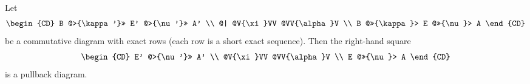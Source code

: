 Let
$$
\begin{CD}
B @>{\kappa'}>> E' @>{\nu'}>> A' \\
@| @V{\xi}VV @VV{\alpha}V \\
B @>>{\kappa}> E @>>{\nu}> A
\end{CD}
$$
be a commutative diagram with exact rows (each row is a short exact sequence). Then the right-hand square
$$
\begin{CD}
E' @>{\nu'}>> A' \\
@V{\xi}VV @VV{\alpha}V \\
E @>>{\nu}> A
\end{CD}
$$
is a pullback diagram.
